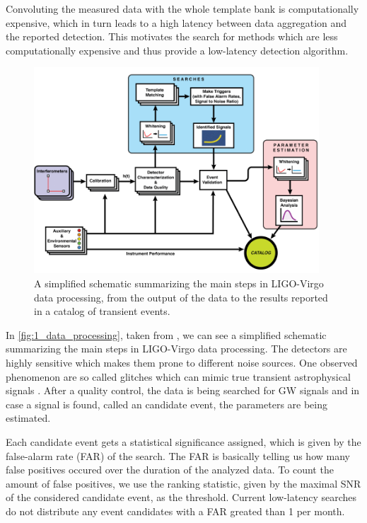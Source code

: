 Convoluting the measured data with the whole template bank is computationally
expensive, which in turn leads to a high latency between data aggregation and
the reported detection. This motivates the search for methods which are less
computationally expensive and thus provide a low-latency detection algorithm.

\begin{figure}[ht]
  \includegraphics[width=0.95\textwidth]{img/1_introduction/data_processing.png}
  \caption{A simplified schematic summarizing the main steps in LIGO-Virgo data
           processing, from the output of the data to the results reported in a
           catalog of transient events.}
  \label{fig:1_data_processing}
  \centering
\end{figure}

In \autoref{fig:1_data_processing}, taken from \cite{2020CQGra..37e5002A},
we can see a simplified schematic summarizing the main steps in LIGO-Virgo data
processing. The detectors are highly sensitive which makes them prone to
different noise sources. One observed phenomenon are so called glitches which
can mimic true transient astrophysical signals \cite{2020CQGra..37e5002A}.
After a quality control, the data is being searched for GW signals and in case
a signal is found, called an candidate event, the parameters are being estimated.

Each candidate event gets a statistical significance assigned, which is given by the 
false-alarm rate (FAR) of the search. The FAR is basically telling us how many false positives
occured over the duration of the analyzed data. To count the amount of
false positives, we use the ranking statistic, given by the maximal SNR
of the considered candidate event, as the threshold. Current low-latency searches
do not distribute any event candidates with a FAR greated than 1 per month.
\cite{PhysRevD.98.024050}


